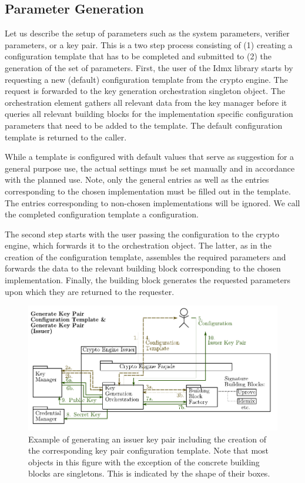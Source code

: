 \subsection{Parameter Generation}
\label{sec:arch:setup}

Let us describe the setup of parameters such as the system parameters, 
verifier parameters, or a key pair.
%
This is a two step process consisting of (1) creating a configuration template that has to 
be completed and submitted to (2) the generation of the set of parameters.
%
First, the user of the Idmx library starts by requesting a new (default) configuration template
from the crypto engine.
%
The request is forwarded to the key generation orchestration singleton object.
%
The orchestration element gathers all relevant data from the key manager 
before it
queries all relevant building blocks for the implementation specific configuration 
parameters that need to be added to the template.
%
The default configuration template is returned to the caller.


While a template is configured with default values that serve as
suggestion for a general purpose use, the actual settings must be set manually and 
in accordance with the planned use.
Note, only the general entries as well as the entries corresponding to the chosen 
implementation must be filled out in the template.
The entries
corresponding to non-chosen implementations will be ignored. 
%
We call the completed configuration template a configuration.



The second step starts with the user passing the configuration to the crypto engine, 
which forwards it to the 
orchestration object.
The latter, as in the creation of the configuration template, assembles the required  
parameters and forwards the data to the relevant 
building block corresponding to the chosen implementation.
Finally, the building block generates the requested parameters upon which they are 
returned to the requester.


\begin{figure}[htbp]
\includegraphics[width=\textwidth]{img/23.pdf}
\caption{Example of generating an issuer key pair including the creation of the 
corresponding key pair configuration template. Note that most objects in this figure 
with the exception of the concrete building blocks are singletons. This is indicated 
by the shape of their boxes.}
\label{fig:issuerkeypair}
\end{figure}

